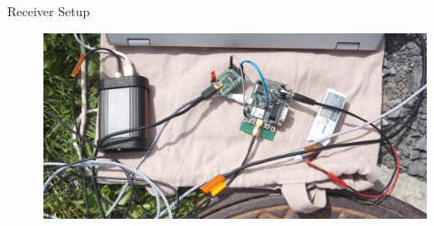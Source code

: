 \documentclass[12pt, compress, xcolor=table]{beamer}
\begin{document}
\begin{frame}{Receiver Setup}
 \begin{figure}
  \includegraphics[width=\textwidth]{images/measurement_kriens_receiver.jpg}
 \end{figure}
\end{frame}
\end{document}
